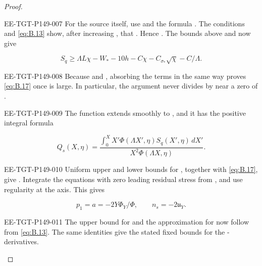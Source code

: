 \begin{proof}
\begin{EESegment}{EE-TGT-P149-007}
For the source itself, use  and the formula
. The conditions
 and \eqref{eq:B.13} show, after increasing
, that . Hence
. The bounds above and
 now give
\end{EESegment}
\begin{equation*}
  S_q\geq\Lambda L\chi-W_*-10h-C\chi-C_{\sigma_*}\sqrt\chi-C/\Lambda.
\end{equation*}
\begin{EESegment}{EE-TGT-P149-008}
Because  and , absorbing the terms in the same way
proves \eqref{eq:B.17} once  is large. In particular, the
argument never divides by  near a zero of
.
\end{EESegment}

\begin{EESegment}{EE-TGT-P149-009}
The function  extends smoothly to , and it has
the positive integral formula
\end{EESegment}
\begin{equation*}
  Q_s(X,\eta)
  =\frac{\displaystyle\int_0^X X'\Phi(\Lambda X',\eta)S_q(X',\eta)\,dX'}
         {X^2\Phi(\Lambda X,\eta)}.
\end{equation*}
\begin{EESegment}{EE-TGT-P149-010}
Uniform upper and lower bounds for , together with \eqref{eq:B.17}, give
. Integrate the equations with zero leading residual stress from
, and use regularity at the axis. This gives
\end{EESegment}
\begin{equation*}
  p_1=a=-2Y\Phi_Y/\Phi,
  \qquad n_s=-2\mathfrak u_Y.
\end{equation*}
\begin{EESegment}{EE-TGT-P149-011}
The upper bound for  and the approximation for
 now follow from \eqref{eq:B.13}. The same identities give the stated
fixed bounds for the -derivatives.
\end{EESegment}


\end{proof}

